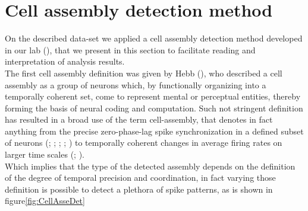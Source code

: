 \section{Cell assembly detection method}
\label{chap:AssemblyMethod}
On the described data-set we applied a cell assembly detection method developed in our lab (\cite{RussoDurstewitz}), that we present in this section to facilitate reading and interpretation of analysis results.\\
The first cell assembly definition was given by Hebb (\cite{Hebb}), who described a cell assembly as a group of neurons which, by functionally organizing into a temporally coherent set, come to represent mental or perceptual entities, thereby forming the basis of neural coding and computation. Such not stringent definition has resulted in a broad use of the term cell-assembly, that denotes in fact anything from the precise zero-phase-lag spike synchronization in a defined subset of neurons (\cite{Abeles}; \cite{Singer}; \cite{Roelfsema}; \cite{Diesmann}; \cite{Harris2003}) to temporally coherent changes in average firing rates on larger time scales (\cite{Goldman}; \cite{Durstewitz}).\\Which implies that the type of the detected assembly depends on the definition of the degree of temporal precision and coordination, in fact varying those definition is possible to detect a plethora of spike patterns, as is shown in figure\ref{fig:CellAsseDet} \\
